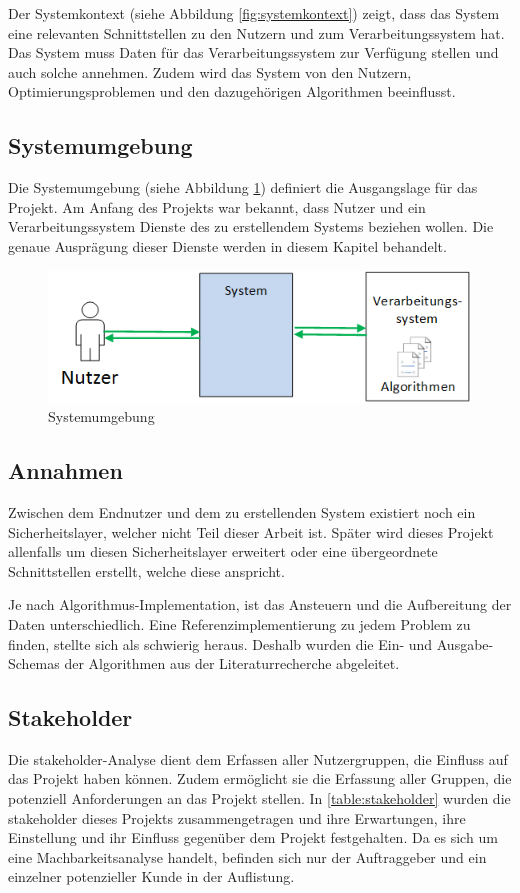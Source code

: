 Der Systemkontext (siehe Abbildung \ref{fig:systemkontext}) zeigt, dass das System eine relevanten Schnittstellen zu den Nutzern und zum Verarbeitungssystem hat. Das System muss Daten 
für das Verarbeitungssystem zur Verfügung stellen und auch solche annehmen. Zudem wird das System von den Nutzern, Optimierungsproblemen und den dazugehörigen Algorithmen 
beeinflusst.

\FloatBarrier
\subsection{Systemumgebung}\label{systemumgebung}
Die Systemumgebung (siehe Abbildung \ref{fig:systemumgebung}) definiert die Ausgangslage für das Projekt. Am Anfang des Projekts war bekannt, dass Nutzer und ein Verarbeitungssystem 
Dienste des zu erstellendem Systems beziehen wollen. Die genaue Ausprägung dieser Dienste werden in diesem Kapitel behandelt.

\begin{figure}[h]
\centering
\includegraphics[scale=0.8]{images/visio/systemumgebung.png}
\caption[Systemumgebung]{Systemumgebung \selfmade{}}
\label{fig:systemumgebung}
\end{figure}

\FloatBarrier
\subsection{Annahmen}\label{annahmen}
Zwischen dem Endnutzer und dem zu erstellenden System existiert noch ein Sicherheitslayer, welcher nicht Teil dieser Arbeit ist. Später wird dieses Projekt allenfalls um diesen Sicherheitslayer 
erweitert oder eine übergeordnete Schnittstellen erstellt, welche diese anspricht. 

Je nach Algorithmus-Implementation, ist das Ansteuern und die Aufbereitung der Daten unterschiedlich. Eine Referenzimplementierung zu jedem Problem zu finden, stellte sich als schwierig 
heraus. Deshalb wurden die Ein- und Ausgabe-Schemas der Algorithmen aus der Literaturrecherche abgeleitet.

\newpage
\subsection{Stakeholder}\label{stakeholder}
Die \gls{stakeholder}-Analyse dient dem Erfassen aller Nutzergruppen, die Einfluss auf das Projekt haben können. Zudem ermöglicht sie die Erfassung aller Gruppen, die potenziell 
Anforderungen an das Projekt stellen. In \autoref{table:stakeholder} wurden die \gls{stakeholder} dieses Projekts zusammengetragen und ihre Erwartungen, ihre 
Einstellung und ihr Einfluss gegenüber dem Projekt festgehalten. Da es sich um eine Machbarkeitsanalyse handelt, befinden sich nur der Auftraggeber und ein einzelner potenzieller Kunde in der 
Auflistung.


